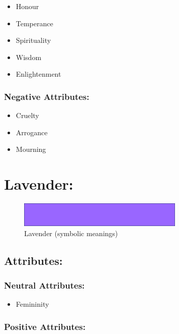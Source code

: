 \documentclass[openleft,oneside,showtrims]{memoir}
\begin{document}
\begin{itemize}
\item Honour
\item Temperance
\item Spirituality
\item Wisdom
\item Enlightenment
\end{itemize}

\subsubsection*{Negative Attributes:}
\label{sec:org81f699c}

\begin{itemize}
\item Cruelty
\item Arrogance
\item Mourning
\end{itemize}

\section{Lavender:}
\label{sec:org43b4d6c}

\begin{figure}[htbp]
\centering
\includegraphics[width=300px]{./media/lavender-banner.png}
\caption{\label{fig:HAP-WR-009}Lavender (symbolic meanings)}
\end{figure}

\subsection{Attributes:}
\label{sec:orgc0b2c64}

\subsubsection*{Neutral Attributes:}
\label{sec:org40a09f5}

\begin{itemize}
\item Femininity
\end{itemize}

\subsubsection*{Positive Attributes:}
\label{sec:org334f881}
\end{document}
